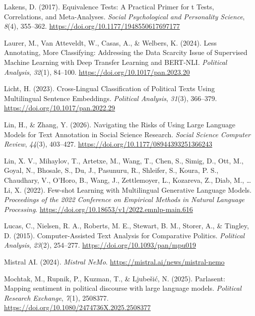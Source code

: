 \documentclass[
  man,
  floatsintext,
  longtable,
  nolmodern,
  notxfonts,
  notimes,
  colorlinks=true,linkcolor=blue,citecolor=blue,urlcolor=blue]{apa7}
\newlength{\cslhangindent}
\newenvironment{CSLReferences}[2] %
 {\begin{list}{}{%
  \setlength{\itemindent}{0pt}
  \setlength{\leftmargin}{0pt}
  \setlength{\parsep}{0pt}
  \ifodd #1
   \setlength{\leftmargin}{\cslhangindent}
   \setlength{\itemindent}{-1\cslhangindent}
  \fi
  \setlength{\itemsep}{#2\baselineskip}}}
 {\end{list}}
\begin{document}
\begin{CSLReferences}{1}{0}
Lakens, D. (2017). Equivalence {Tests}: {A Practical Primer} for t
{Tests}, {Correlations}, and {Meta-Analyses}. \emph{Social Psychological
and Personality Science}, \emph{8}(4), 355--362.
\url{https://doi.org/10.1177/1948550617697177}

Laurer, M., Van Atteveldt, W., Casas, A., \& Welbers, K. (2024). Less
{Annotating}, {More Classifying}: {Addressing} the {Data Scarcity Issue}
of {Supervised Machine Learning} with {Deep Transfer Learning} and
{BERT-NLI}. \emph{Political Analysis}, \emph{32}(1), 84--100.
\url{https://doi.org/10.1017/pan.2023.20}

Licht, H. (2023). Cross-{Lingual Classification} of {Political Texts
Using Multilingual Sentence Embeddings}. \emph{Political Analysis},
\emph{31}(3), 366--379. \url{https://doi.org/10.1017/pan.2022.29}

Lin, H., \& Zhang, Y. (2026). Navigating the {Risks} of {Using Large
Language Models} for {Text Annotation} in {Social Science Research}.
\emph{Social Science Computer Review}, \emph{44}(3), 403--427.
\url{https://doi.org/10.1177/08944393251366243}

Lin, X. V., Mihaylov, T., Artetxe, M., Wang, T., Chen, S., Simig, D.,
Ott, M., Goyal, N., Bhosale, S., Du, J., Pasunuru, R., Shleifer, S.,
Koura, P. S., Chaudhary, V., O'Horo, B., Wang, J., Zettlemoyer, L.,
Kozareva, Z., Diab, M., \ldots{} Li, X. (2022). Few-shot {Learning} with
{Multilingual Generative Language Models}. \emph{Proceedings of the 2022
{Conference} on {Empirical Methods} in {Natural Language Processing}}.
\url{https://doi.org/10.18653/v1/2022.emnlp-main.616}

Lucas, C., Nielsen, R. A., Roberts, M. E., Stewart, B. M., Storer, A.,
\& Tingley, D. (2015). Computer-{Assisted Text Analysis} for
{Comparative Politics}. \emph{Political Analysis}, \emph{23}(2),
254--277. \url{https://doi.org/10.1093/pan/mpu019}

Mistral AI. (2024). \emph{Mistral {NeMo}}.
\url{https://mistral.ai/news/mistral-nemo}

Mochtak, M., Rupnik, P., Kuzman, T., \& Ljubešić, N. (2025). Parlasent:
Mapping sentiment in political discourse with large language models.
\emph{Political Research Exchange}, \emph{7}(1), 2508377.
\url{https://doi.org/10.1080/2474736X.2025.2508377}


\end{CSLReferences}
\end{document}
